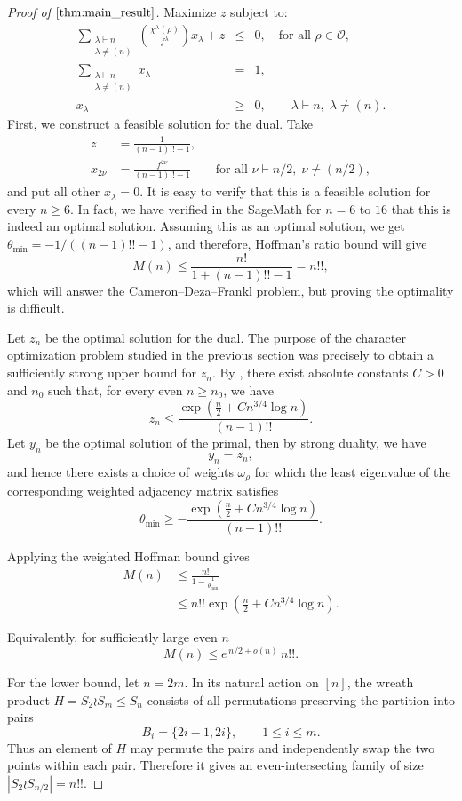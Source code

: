 \documentclass[12pt]{article}
\theoremstyle{definition}
\newcommand{\OO}{\mathcal O}
\newcommand{\1}{\mathbf 1}
\begin{document}
\begin{proof}[Proof of $\Cref{thm:main_result}$]
\noindent Maximize $z$ subject to:
\begin{eqnarray*}
    \sum_{\substack{\lambda\vdash n\\\lambda\neq(n)}} \left( \frac{\chi^{\lambda}(\rho) }{f^{\lambda}} \right) x_{\lambda} + z &\leq& 0, \quad \text{for all } \rho \in \OO,\\
    \sum_{\substack{\lambda\vdash n\\\lambda\neq(n)}} x_{\lambda} &=& 1,\\
    x_{\lambda}&\geq& 0, \qquad \lambda\vdash n,\; \lambda\neq (n).
\end{eqnarray*}
First, we construct a feasible solution for the dual. 
Take  
\begin{align*}
    z&=\frac{1}{(n-1)!!-1},\\
    x_{2\nu}&=\frac{f^{2\nu}}{(n-1)!!-1}\qquad \text{for all }\nu\vdash n/2,\;\nu\neq (n/2),
\end{align*}
and put all other $x_\lambda=0$. It is easy to verify that this is a feasible solution for every $n\geq 6$. In fact, we have verified in the SageMath for $n=6$ to $16$ that this is indeed an optimal solution. Assuming this as an optimal solution, we get $\theta_{\min}=-1/((n-1)!!-1)$, and therefore, Hoffman's ratio bound will give
$$M(n)\leq \frac{n!}{1+(n-1)!!-1}=n!!,$$
which will answer the Cameron--Deza--Frankl problem, but proving the optimality is difficult. 






Let $z_n$ be the optimal solution for the dual. The purpose of the
character optimization problem studied in the previous section was precisely
to obtain a sufficiently strong upper bound for $z_n$. By
, there exist absolute constants
$C>0$ and $n_0$ such that, for every even $n\geq n_0$, we have
$$
z_n
\leq
\frac{
\exp\left(
\frac{n}{2}
+
C n^{3/4}\log n
\right)
}{
(n-1)!!
}.
$$
Let $y_n$ be the optimal solution of the primal, then by strong duality, we have
$$
y_n=z_n,
$$
and hence there exists a choice of weights $\omega_\rho$ for which the least
eigenvalue of the corresponding weighted adjacency matrix satisfies
$$\theta_{\min}\geq-\frac{\exp\left(\frac{n}{2}+C n^{3/4}\log n\right)}{(n-1)!!}.$$


Applying the weighted Hoffman bound gives
\begin{align*}
    M(n)&\leq\frac{n!}{1-\frac{1}{\theta_{\min}}}\\
    &\leq n!!\exp\left(\frac{n}{2}+C n^{3/4}\log n\right).
\end{align*}

Equivalently, for sufficiently large even $n$
$$
M(n)\leq e^{\, n/2+o(n)}\,n!!.
$$

For the lower bound, let $n=2m$. In its natural action on $[n]$, the wreath product $H=S_2\wr S_m\le S_n$ consists of all permutations preserving the partition into pairs
$$B_i=\{2i-1,2i\},\qquad 1\le i\le m.$$
Thus an element of $H$ may permute the pairs and independently swap the two points within each pair. Therefore it gives an even-intersecting family of size $|S_2\wr S_{n/2}|=n!!$.
\end{proof}
\end{document}
